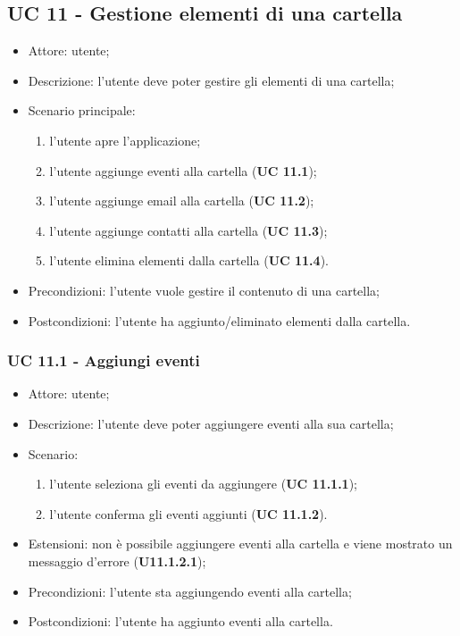     \subsection{UC 11 - Gestione elementi di una cartella}
        \begin{itemize}
            \item Attore: utente;
            \item Descrizione: l'utente deve poter gestire gli elementi di una cartella;
            \item Scenario principale:
                \begin{enumerate}
                \item l’utente apre l'applicazione;
                \item l’utente aggiunge eventi alla cartella (\textbf{UC 11.1});
                \item l’utente aggiunge email alla cartella (\textbf{UC 11.2});
                \item l’utente aggiunge contatti alla cartella (\textbf{UC 11.3});
                \item l’utente elimina elementi dalla cartella (\textbf{UC 11.4}).              
                \end{enumerate}
            \item Precondizioni: l'utente vuole gestire il contenuto di una cartella;
            \item Postcondizioni: l'utente ha aggiunto/eliminato elementi dalla cartella.
        \end{itemize}
    \subsubsection{UC 11.1 - Aggiungi eventi}
    \begin{itemize}
        \item Attore: utente;
        \item Descrizione: l'utente deve poter aggiungere eventi alla sua cartella;
        \item Scenario:
        \begin{enumerate}
        \item l'utente seleziona gli eventi da aggiungere (\textbf{UC 11.1.1});
        \item l'utente conferma gli eventi aggiunti (\textbf{UC 11.1.2}).
        \end{enumerate}
        \item Estensioni: non è possibile aggiungere eventi alla cartella e viene mostrato un messaggio d'errore (\textbf{U11.1.2.1});
        \item Precondizioni: l'utente sta aggiungendo eventi alla cartella;
        \item Postcondizioni: l'utente ha aggiunto eventi alla cartella.
    \end{itemize}
